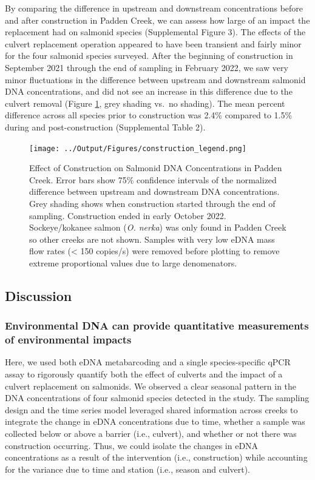 \documentclass[
]{article}
\begin{document}
By comparing the difference in upstream and downstream concentrations
before and after construction in Padden Creek, we can assess how large
of an impact the replacement had on salmonid species (Supplemental
Figure 3). The effects of the culvert replacement operation appeared to
have been transient and fairly minor for the four salmonid species
surveyed. After the beginning of construction in September 2021 through
the end of sampling in February 2022, we saw very minor fluctuations in
the difference between upstream and downstream salmonid DNA
concentrations, and did not see an increase in this difference due to
the culvert removal (Figure \ref{fig:construction}, grey shading vs.~no
shading). The mean percent difference across all species prior to
construction was 2.4\% compared to 1.5\% during and post-construction
(Supplemental Table 2).

\begin{figure}
\centering
\texttt{[image: ../Output/Figures/construction\_legend.png]}
\caption{Effect of Construction on Salmonid DNA Concentrations in Padden
Creek. Error bars show 75\% confidence intervals of the normalized
difference between upstream and downstream DNA concentrations. Grey
shading shows when construction started through the end of sampling.
Construction ended in early October 2022. Sockeye/kokanee salmon
(\emph{O. nerka}) was only found in Padden Creek so other creeks are not
shown. Samples with very low eDNA mass flow rates (\textless{} 150
copies/s) were removed before plotting to remove extreme proportional
values due to large denomenators.\label{fig:construction}}
\end{figure}

\hypertarget{discussion}{%
\subsection{Discussion}\label{discussion}}

\hypertarget{environmental-dna-can-provide-quantitative-measurements-of-environmental-impacts}{%
\subsubsection{Environmental DNA can provide quantitative measurements
of environmental
impacts}\label{environmental-dna-can-provide-quantitative-measurements-of-environmental-impacts}}

Here, we used both eDNA metabarcoding and a single species-specific qPCR
assay to rigorously quantify both the effect of culverts and the impact
of a culvert replacement on salmonids. We observed a clear seasonal
pattern in the DNA concentrations of four salmonid species detected in
the study. The sampling design and the time series model leveraged
shared information across creeks to integrate the change in eDNA
concentrations due to time, whether a sample was collected below or
above a barrier (i.e., culvert), and whether or not there was
construction occurring. Thus, we could isolate the changes in eDNA
concentrations as a result of the intervention (i.e., construction)
while accounting for the variance due to time and station (i.e., season
and culvert).
\end{document}
